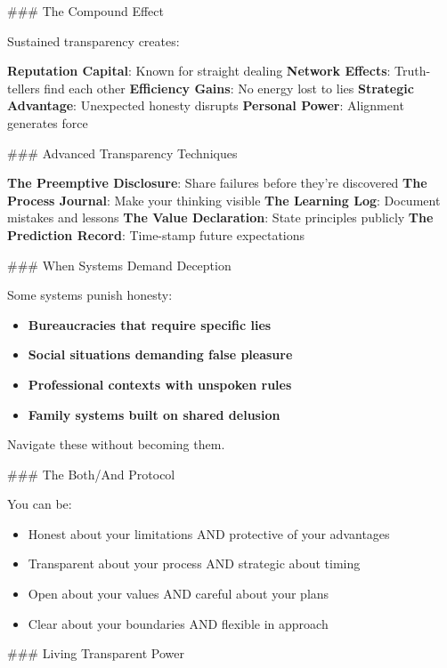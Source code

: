 \documentclass[12pt]{book}
\begin{document}
\#\#\# The Compound Effect

Sustained transparency creates:

\textbf{Reputation Capital}: Known for straight dealing
\textbf{Network Effects}: Truth-tellers find each other
\textbf{Efficiency Gains}: No energy lost to lies
\textbf{Strategic Advantage}: Unexpected honesty disrupts
\textbf{Personal Power}: Alignment generates force

\#\#\# Advanced Transparency Techniques

\textbf{The Preemptive Disclosure}: Share failures before they're discovered
\textbf{The Process Journal}: Make your thinking visible
\textbf{The Learning Log}: Document mistakes and lessons
\textbf{The Value Declaration}: State principles publicly
\textbf{The Prediction Record}: Time-stamp future expectations

\#\#\# When Systems Demand Deception

Some systems punish honesty:

\begin{itemize}
\item \textbf{Bureaucracies that require specific lies}
\item \textbf{Social situations demanding false pleasure}
\item \textbf{Professional contexts with unspoken rules}
\item \textbf{Family systems built on shared delusion}

\end{itemize}
Navigate these without becoming them.

\#\#\# The Both/And Protocol

You can be:
\begin{itemize}
\item Honest about your limitations AND protective of your advantages
\item Transparent about your process AND strategic about timing
\item Open about your values AND careful about your plans
\item Clear about your boundaries AND flexible in approach

\end{itemize}
\#\#\# Living Transparent Power
\end{document}
